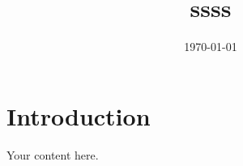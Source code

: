 \documentclass[11pt,a4paper]{article}
\title{ssss}
\author{}
\date{\today}
\begin{document}
\maketitle

\section{Introduction}

Your content here.
\end{document}
